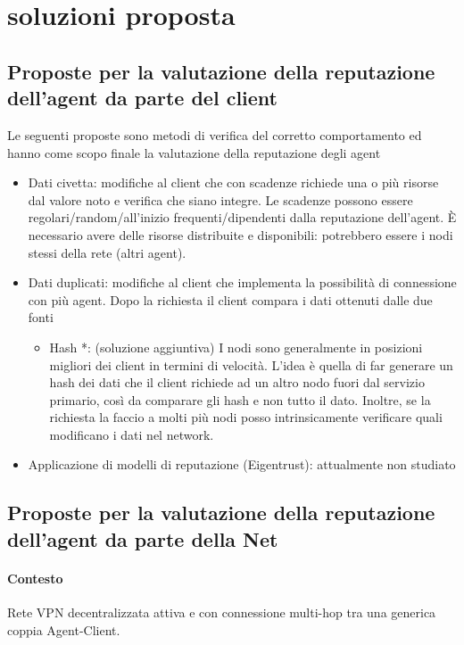 \documentclass[]{article}
\begin{document}
	\section{soluzioni proposta}
	\subsection{Proposte per la valutazione della reputazione dell'agent da parte del client}
	
	Le seguenti proposte sono metodi di verifica del corretto comportamento ed hanno come scopo finale la valutazione della reputazione degli agent
	\begin{itemize}
		\item Dati civetta: modifiche al client che con scadenze richiede una o più risorse dal valore noto e verifica che siano integre. Le scadenze possono essere regolari/random/all’inizio frequenti/dipendenti dalla reputazione dell’agent. È necessario avere delle risorse distribuite e disponibili: potrebbero essere i nodi stessi della rete (altri agent).
		\item Dati duplicati: modifiche al client che implementa la possibilità di connessione con più agent. Dopo la richiesta il client compara i dati ottenuti dalle due fonti
		\begin{itemize}
			\item Hash *: (soluzione aggiuntiva) I nodi sono generalmente in posizioni migliori dei client in termini di velocità. L’idea è quella di far generare un hash dei dati che il client richiede ad un altro nodo fuori dal servizio primario, così da comparare gli hash e non tutto il dato.
			Inoltre, se la richiesta la faccio a molti più nodi posso intrinsicamente verificare quali modificano i dati nel network.
		\end{itemize}
		\item Applicazione di modelli di reputazione (Eigentrust): attualmente non studiato
	\end{itemize}

	\pagebreak

	\subsection{Proposte per la valutazione della reputazione dell'agent da parte della Net}
		\paragraph{Contesto}
			Rete VPN decentralizzata attiva e con connessione multi-hop tra una generica coppia Agent-Client.
			
\end{document}
